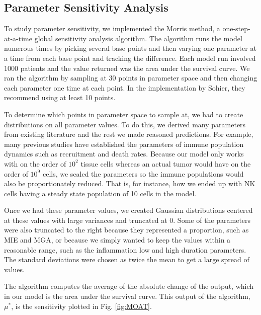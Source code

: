 \documentclass[11pt]{article}
\begin{document}
\subsection{Parameter Sensitivity Analysis}
To study parameter sensitivity, we implemented the Morris method, a one-step-at-a-time global sensitivity analysis algorithm.
The algorithm runs the model numerous times by picking several base points and then varying one parameter at a time from each base point and tracking the difference\cite{morris1991factorial, sohier2014improvement}.
Each model run involved 1000 patients and the value returned was the area under the survival curve.
We ran the algorithm by sampling at 30 points in parameter space and then changing each parameter one time at each point.
In the implementation by Sohier, they recommend using at least 10 points\cite{sohier2014improvement}.
\par
To determine which points in parameter space to sample at, we had to create distributions on all parameter values.
To do this, we derived many parameters from existing literature and the rest we made reasoned predictions.
For example, many previous studies have established the parameters of immune population dynamics such as recruitment and death rates\cite{de2014modeling}.
Because our model only works with on the order of $10^2$ tissue cells whereas an actual tumor would have on the order of $10^9$ cells\cite{de2014modeling}, we scaled the parameters so the immune populations would also be proportionately reduced.
That is, for instance, how we ended up with NK cells having a steady state population of 10 cells in the model.
\par
Once we had these parameter values, we created Gaussian distributions centered at these values with large variances and truncated at 0.
Some of the parameters were also truncated to the right because they represented a proportion, such as MIE and MGA, or because we simply wanted to keep the values within a reasonable range, such as the inflammation low and high duration parameters.
The standard deviations were chosen as twice the mean to get a large spread of values.
\par
The algorithm computes the average of the absolute change of the output, which in our model is the area under the survival curve.
This output of the algorithm, $\mu^*$, is the sensitivity plotted in Fig. \ref{fig:MOAT}.
\end{document}
